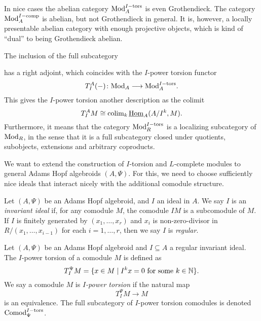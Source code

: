 \begin{remark}
    In nice cases the abelian category $\mathrm{Mod}_A^{I-\mathrm{tors}}$ is even Grothendieck. The category $\mathrm{Mod}_A^{I-\mathrm{comp}}$ is abelian, but not Grothendieck in general. It is, however, a locally presentable abelian category with enough projective objects, which is kind of ``dual'' to being Grothendieck abelian. 
\end{remark}

\begin{remark}
    The inclusion of the full subcategory
    \begin{center}
    \end{center}
    has a right adjoint, which coincides with the $I$-power torsion functor 
    \[T_I^A(-)\colon \mathrm{Mod}_A \longrightarrow \mathrm{Mod}_A^{I-\mathrm{tors}}.\] 
    This gives the $I$-power torsion another description as the colimit 
    \[T_I^A M \cong \operatorname{colim}_k \operatorname{\underline{Hom}}_A (A/I^k, M).\]
    Furthermore, it means that the category $\mathrm{Mod}_R^{I-\mathrm{tors}}$ is a localizing subcategory of $\mathrm{Mod}_R$, in the sense that it is a full subcategory closed under quotients, subobjects, extensions and arbitrary coproducts. 
\end{remark}

We want to extend the construction of $I$-torsion and $L$-complete modules to general Adams Hopf algebroids $(A,\Psi)$. For this, we need to choose sufficiently nice ideals that interact nicely with the additional comodule structure. 

\begin{definition}
    Let $(A, \Psi)$ be an Adams Hopf algebroid, and $I$ an ideal in $A$. We say $I$ is an \emph{invariant ideal} if, for any comodule $M$, the comodule $IM$ is a subcomodule of $M$. If $I$ is finitely generated by $(x_1, \ldots, x_r)$ and $x_i$ is non-zero-divisor in $R/(x_1, \ldots, x_{i-1})$ for each $i=1, \ldots, r$, then we say $I$ is \emph{regular}. 
\end{definition}

\begin{definition}
    \label{ch0:def:I-power-torsion-comodule}
    Let $(A,\Psi)$ be an Adams Hopf algebroid and $I\subseteq A$ a regular invariant ideal. The $I$-power torsion of a comodule $M$ is defined as 
    \[T_I^\Psi M = \{x\in M \mid I^kx = 0 \text{ for some } k\in \mathbb{N}\}.\]
    We say a comodule $M$ is \emph{$I$-power torsion} if the natural map 
    \[T_I^\Psi M\longrightarrow M\] 
    is an equivalence. The full subcategory of $I$-power torsion comodules is denoted $\mathrm{Comod}_\Psi^{I-\mathrm{tors}}$. 
\end{definition}

